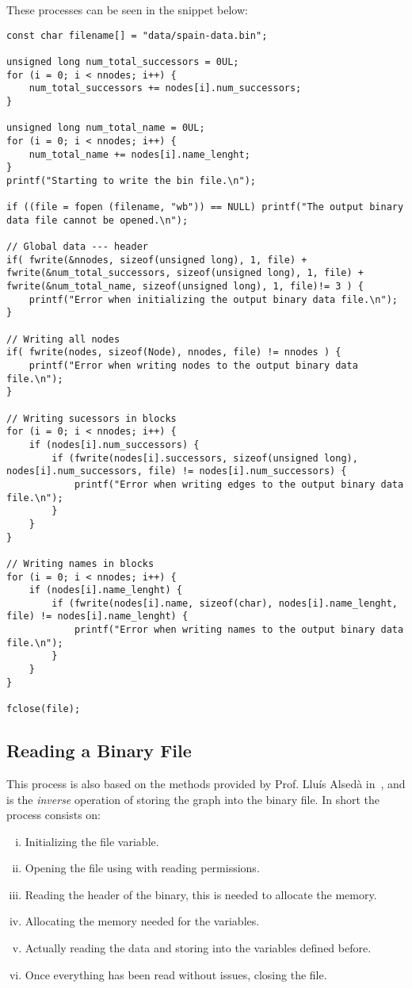 These processes can be seen in the snippet below:
\begin{lstlisting}
const char filename[] = "data/spain-data.bin";

unsigned long num_total_successors = 0UL;
for (i = 0; i < nnodes; i++) {
	num_total_successors += nodes[i].num_successors;
}

unsigned long num_total_name = 0UL;
for (i = 0; i < nnodes; i++) {
	num_total_name += nodes[i].name_lenght;
}
printf("Starting to write the bin file.\n");

if ((file = fopen (filename, "wb")) == NULL) printf("The output binary data file cannot be opened.\n");

// Global data --- header
if( fwrite(&nnodes, sizeof(unsigned long), 1, file) +
fwrite(&num_total_successors, sizeof(unsigned long), 1, file) +
fwrite(&num_total_name, sizeof(unsigned long), 1, file)!= 3 ) {
	printf("Error when initializing the output binary data file.\n");
}

// Writing all nodes
if( fwrite(nodes, sizeof(Node), nnodes, file) != nnodes ) {
	printf("Error when writing nodes to the output binary data file.\n");
}

// Writing sucessors in blocks
for (i = 0; i < nnodes; i++) {
	if (nodes[i].num_successors) {
		if (fwrite(nodes[i].successors, sizeof(unsigned long), nodes[i].num_successors, file) != nodes[i].num_successors) {
			printf("Error when writing edges to the output binary data file.\n");
		}
	}
}

// Writing names in blocks
for (i = 0; i < nnodes; i++) {
	if (nodes[i].name_lenght) {
		if (fwrite(nodes[i].name, sizeof(char), nodes[i].name_lenght, file) != nodes[i].name_lenght) {
			printf("Error when writing names to the output binary data file.\n");
		}
	}
}

fclose(file);
\end{lstlisting}

\newpage
\subsection{Reading a Binary File}
This process is also based on the methods provided by Prof. Lluís Alsedà in~\cite{AlsedaRWBin}, and is the \emph{inverse} operation of storing the graph into the binary file. In short the process consists on:
\begin{enumerate}[(i)]
	\item Initializing the  file variable.
    \item Opening the  file using  with reading permissions.
    \item Reading the header of the binary, this is needed to allocate the memory.
    \item Allocating the memory needed for the variables.
    \item Actually reading the data and storing into the variables defined before.
    \item Once everything has been read without issues, closing the  file.
\end{enumerate}

